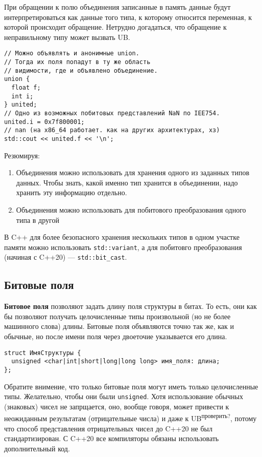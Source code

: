 \documentclass[14pt, a4paper]{extarticle}
\begin{document}
При обращении к полю объединения записанные в память данные будут
интерпретироваться как данные того типа, к которому относится переменная, к которой происходит
обращение. Нетрудно догадаться, что обращение к неправильному типу может вызвать UB.

\begin{verbatim}
// Можно объявлять и анонимные union.
// Тогда их поля попадут в ту же область
// видимости, где и объявлено объединение.
union {
  float f;
  int i;
} united;
// Одно из возможных побитовых представлений NaN по IEE754.
united.i = 0x7f800001;
// nan (на x86_64 работает. как на других архитектурах, хз)
std::cout << united.f << '\n';
\end{verbatim}

Резюмируя:
\begin{enumerate}
  \item Объединения можно использовать для хранения одного из заданных типов данных. Чтобы знать,
  какой именно тип хранится в объединении, надо хранить эту информацию отдельно.
  \item Объединения можно использовать для побитового преобразования одного типа в другой
\end{enumerate}

{\small В C++ для более безопасного хранения нескольких типов в одном участке памяти можно использовать
\verb|std::variant|, а для побитовго преобразования (начиная с C++20) --- \verb|std::bit_cast|.}

\subsection*{Битовые поля}
\textbf{Битовое поля} позволяют задать длину поля структуры в битах. %
То есть, они как бы позволяют получать целочисленные типы произвольной (но не
более машинного слова) длины. Битовые поля объявляются точно так же, как и обычные,
но после имени поля через двоеточие указывается его длина.
\begin{verbatim}
struct ИмяСтруктуры {
  unsigned <char|int|short|long|long long> имя_поля: длина;
};
\end{verbatim}

Обратите внимение, что только битовые поля могут иметь только целочисленные типы.
{\small Желательно, чтобы они были \verb|unsigned|. Хотя использование обычных (знаковых)
чисел не запрщается, оно, вообще говоря, может привести к неожиданным результатам (отрицательные числа) и даже к UB\textsuperscript{проверить?},
потому что способ представления отрицательных чисел до C++20 не был стандартизирован.
С C++20 все компиляторы обязаны использовать дополнительный код.}
\end{document}

